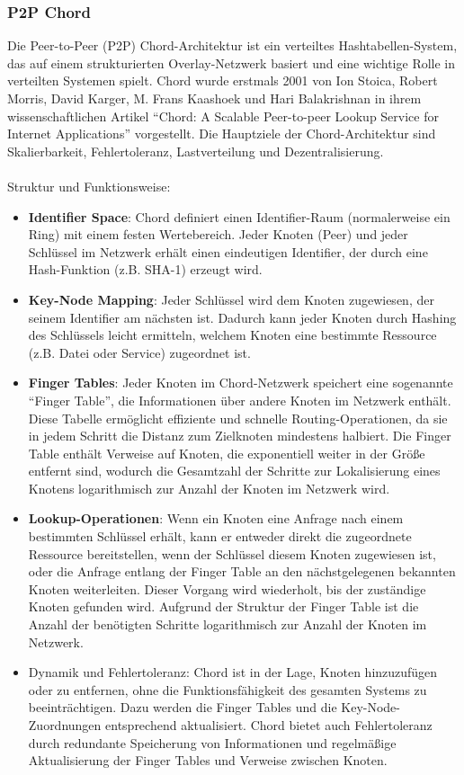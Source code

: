 \documentclass[../vs-script-first-v01.tex]{subfiles}
\begin{document}
\subsubsection{P2P Chord}
Die Peer-to-Peer (P2P) Chord-Architektur ist ein verteiltes Hashtabellen-System, das auf einem strukturierten Overlay-Netzwerk basiert und eine wichtige Rolle in verteilten Systemen spielt. Chord wurde erstmals 2001 von Ion Stoica, Robert Morris, David Karger, M. Frans Kaashoek und Hari Balakrishnan in ihrem wissenschaftlichen Artikel \enquote{Chord: A Scalable Peer-to-peer Lookup Service for Internet Applications} vorgestellt. Die Hauptziele der Chord-Architektur sind Skalierbarkeit, Fehlertoleranz, Lastverteilung und Dezentralisierung.
\\\\
Struktur und Funktionsweise:
\begin{itemize} 
\item \textbf{Identifier Space}: Chord definiert einen Identifier-Raum (normalerweise ein Ring) mit einem festen Wertebereich. Jeder Knoten (Peer) und jeder Schlüssel im Netzwerk erhält einen eindeutigen Identifier, der durch eine Hash-Funktion (z.B. SHA-1) erzeugt wird.
\item \textbf{Key-Node Mapping}: Jeder Schlüssel wird dem Knoten zugewiesen, der seinem Identifier am nächsten ist. Dadurch kann jeder Knoten durch Hashing des Schlüssels leicht ermitteln, welchem Knoten eine bestimmte Ressource (z.B. Datei oder Service) zugeordnet ist.
\item \textbf{Finger Tables}: Jeder Knoten im Chord-Netzwerk speichert eine sogenannte \enquote{Finger Table}, die Informationen über andere Knoten im Netzwerk enthält. Diese Tabelle ermöglicht effiziente und schnelle Routing-Operationen, da sie in jedem Schritt die Distanz zum Zielknoten mindestens halbiert. Die Finger Table enthält Verweise auf Knoten, die exponentiell weiter in der Größe entfernt sind, wodurch die Gesamtzahl der Schritte zur Lokalisierung eines Knotens logarithmisch zur Anzahl der Knoten im Netzwerk wird.
\item \textbf{Lookup-Operationen}: Wenn ein Knoten eine Anfrage nach einem bestimmten Schlüssel erhält, kann er entweder direkt die zugeordnete Ressource bereitstellen, wenn der Schlüssel diesem Knoten zugewiesen ist, oder die Anfrage entlang der Finger Table an den nächstgelegenen bekannten Knoten weiterleiten. Dieser Vorgang wird wiederholt, bis der zuständige Knoten gefunden wird. Aufgrund der Struktur der Finger Table ist die Anzahl der benötigten Schritte logarithmisch zur Anzahl der Knoten im Netzwerk.
\item Dynamik und Fehlertoleranz: Chord ist in der Lage, Knoten hinzuzufügen oder zu entfernen, ohne die Funktionsfähigkeit des gesamten Systems zu beeinträchtigen. Dazu werden die Finger Tables und die Key-Node-Zuordnungen entsprechend aktualisiert. Chord bietet auch Fehlertoleranz durch redundante Speicherung von Informationen und regelmäßige Aktualisierung der Finger Tables und Verweise zwischen Knoten.
\end{itemize} 
\end{document}
